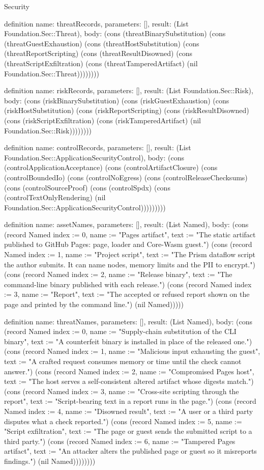 \begin{lexlean}{Security}
\begin{semanticmodule}
definition{
  name: threatRecords,
  parameters: [],
  result: (List Foundation.Sec::Threat),
  body: (cons (threatBinarySubstitution) (cons (threatGuestExhaustion) (cons (threatHostSubstitution) (cons (threatReportScripting) (cons (threatResultDisowned) (cons (threatScriptExfiltration) (cons (threatTamperedArtifact) (nil Foundation.Sec::Threat))))))))
}

definition{
  name: riskRecords,
  parameters: [],
  result: (List Foundation.Sec::Risk),
  body: (cons (riskBinarySubstitution) (cons (riskGuestExhaustion) (cons (riskHostSubstitution) (cons (riskReportScripting) (cons (riskResultDisowned) (cons (riskScriptExfiltration) (cons (riskTamperedArtifact) (nil Foundation.Sec::Risk))))))))
}

definition{
  name: controlRecords,
  parameters: [],
  result: (List Foundation.Sec::ApplicationSecurityControl),
  body: (cons (controlApplicationAcceptance) (cons (controlArtifactClosure) (cons (controlBoundedIo) (cons (controlNoEgress) (cons (controlReleaseChecksums) (cons (controlSourceProof) (cons (controlSpdx) (cons (controlTextOnlyRendering) (nil Foundation.Sec::ApplicationSecurityControl)))))))))
}

definition{
  name: assetNames,
  parameters: [],
  result: (List Named),
  body: (cons (record Named {index := 0, name := "Pages artifact", text := "The static artifact published to GitHub Pages: page, loader and Core-Wasm guest."}) (cons (record Named {index := 1, name := "Project script", text := "The Prism dataflow script the author submits. It can name nodes, memory limits and the PII to encrypt."}) (cons (record Named {index := 2, name := "Release binary", text := "The command-line binary published with each release."}) (cons (record Named {index := 3, name := "Report", text := "The accepted or refused report shown on the page and printed by the command line."}) (nil Named)))))
}

definition{
  name: threatNames,
  parameters: [],
  result: (List Named),
  body: (cons (record Named {index := 0, name := "Supply-chain substitution of the CLI binary", text := "A counterfeit binary is installed in place of the released one."}) (cons (record Named {index := 1, name := "Malicious input exhausting the guest", text := "A crafted request consumes memory or time until the check cannot answer."}) (cons (record Named {index := 2, name := "Compromised Pages host", text := "The host serves a self-consistent altered artifact whose digests match."}) (cons (record Named {index := 3, name := "Cross-site scripting through the report", text := "Script-bearing text in a report runs in the page."}) (cons (record Named {index := 4, name := "Disowned result", text := "A user or a third party disputes what a check reported."}) (cons (record Named {index := 5, name := "Script exfiltration", text := "The page or guest sends the submitted script to a third party."}) (cons (record Named {index := 6, name := "Tampered Pages artifact", text := "An attacker alters the published page or guest so it misreports findings."}) (nil Named))))))))
}


\end{semanticmodule}
\end{lexlean}
